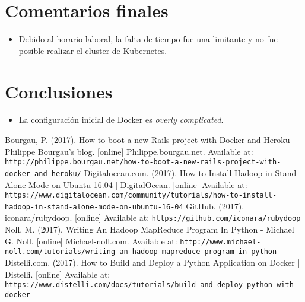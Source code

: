 \documentclass{article}
\begin{document}
\section{Comentarios finales}
\begin{itemize}
  \item Debido al horario laboral, la falta de tiempo fue una limitante y no fue posible realizar el cluster de Kubernetes. 
\end{itemize}

\section{Conclusiones}
\begin{itemize}
  \item La configuraci\'on inicial de Docker es \emph{overly complicated}.
\end{itemize}

\begin{thebibliography}{99}
  Bourgau, P. (2017). How to boot a new Rails project with Docker and Heroku - Philippe Bourgau's blog. [online] Philippe.bourgau.net. Available at: \texttt{http://philippe.bourgau.net/how-to-boot-a-new-rails-project-with-docker-and-heroku/}
  Digitalocean.com. (2017). How to Install Hadoop in Stand-Alone Mode on Ubuntu 16.04 | DigitalOcean. [online] Available at: \texttt{https://www.digitalocean.com/community/tutorials/how-to-install-hadoop-in-stand-alone-mode-on-ubuntu-16-04}
  GitHub. (2017). iconara/rubydoop. [online] Available at: \texttt{https://github.com/iconara/rubydoop}
  Noll, M. (2017). Writing An Hadoop MapReduce Program In Python - Michael G. Noll. [online] Michael-noll.com. Available at: \texttt{http://www.michael-noll.com/tutorials/writing-an-hadoop-mapreduce-program-in-python}
  Distelli.com. (2017). How to Build and Deploy a Python Application on Docker | Distelli. [online] Available at: \texttt{https://www.distelli.com/docs/tutorials/build-and-deploy-python-with-docker}
\end{thebibliography}
\end{document}
